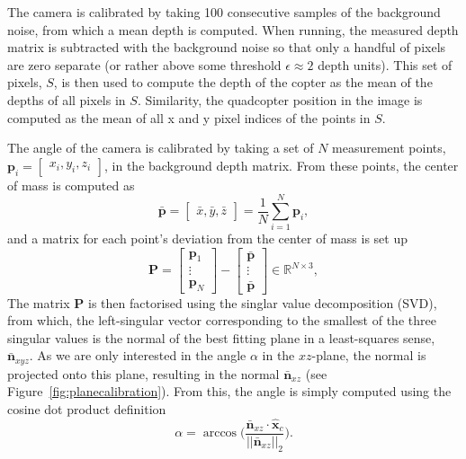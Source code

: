 \documentclass{article}
\begin{document}
The camera is calibrated by taking 100 consecutive samples of the background noise, from which a mean depth is computed. 
When running, the measured depth matrix is subtracted with the background noise so that only a handful of pixels are zero separate (or rather above some threshold $\epsilon\approx 2$ depth units). This set of pixels, $S$, is then used to compute the depth of the copter as the mean of the depths of all pixels in $S$. Similarity, the quadcopter position in the image is computed as the mean of all x and y pixel indices of the points in $S$.

The angle of the camera is calibrated by taking a set of $N$ measurement points, $\mathbf{p}_i=\begin{bmatrix}x_i,y_i,z_i\end{bmatrix}$, in the background depth matrix. From these points, the center of mass is computed as
\begin{equation}
\bar{\mathbf{p}}= \begin{bmatrix}\bar{x},\bar{y},\bar{z}\end{bmatrix} = \frac{1}{N}\sum_{i = 1}^N \mathbf{p}_i,
\end{equation}
and a matrix for each point's deviation from the center of mass is set up
\begin{equation}
\mathbf{P} = \begin{bmatrix}\mathbf{p}_1\\ \vdots \\ \mathbf{p}_N\end{bmatrix} -  \begin{bmatrix}\bar{\mathbf{p}}\\ \vdots \\ \bar{\mathbf{p}}\end{bmatrix}\in\mathbb{R}^{N\times 3},
\end{equation}
The matrix $\mathbf{P}$ is then factorised using the singlar value decomposition (SVD), from which, the left-singular vector corresponding to the smallest of the three singular values is the normal of the best fitting plane in a least-squares sense, $\bar{\mathbf{n}}_{xyz}$. As we are only interested in the angle $\alpha$ in the $xz$-plane, the normal is projected onto this plane, resulting in the normal $\bar{\mathbf{n}}_{xz}$ (see Figure~\ref{fig:planecalibration}). From this, the angle is simply computed using the cosine dot product definition
\begin{equation}
\alpha = \arccos\Big(\frac{\bar{\mathbf{n}}_{xz}\cdot \hat{\mathbf{x}}_c}{||\bar{\mathbf{n}}_{xz}||_2}\Big).
\end{equation}
\end{document}
